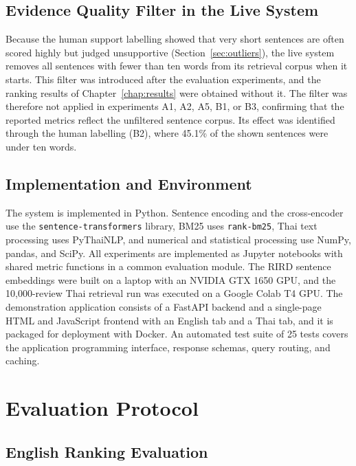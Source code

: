\subsection{Evidence Quality Filter in the Live System}
\label{sec:livefilter}

Because the human support labelling showed that very short sentences are often scored highly but judged unsupportive (Section~\ref{sec:outliers}), the live system removes all sentences with fewer than ten words from its retrieval corpus when it starts. This filter was introduced after the evaluation experiments, and the ranking results of Chapter~\ref{chap:results} were obtained without it. The filter was therefore not applied in experiments A1, A2, A5, B1, or B3, confirming that the reported metrics reflect the unfiltered sentence corpus. Its effect was identified through the human labelling (B2), where 45.1\% of the shown sentences were under ten words.

\subsection{Implementation and Environment}
\label{sec:implementation}

The system is implemented in Python. Sentence encoding and the cross-encoder use the \texttt{sentence-transformers} library, BM25 uses \texttt{rank-bm25}, Thai text processing uses PyThaiNLP, and numerical and statistical processing use NumPy, pandas, and SciPy. All experiments are implemented as Jupyter notebooks with shared metric functions in a common evaluation module. The RIRD sentence embeddings were built on a laptop with an NVIDIA GTX 1650 GPU, and the 10,000-review Thai retrieval run was executed on a Google Colab T4 GPU. The demonstration application consists of a FastAPI backend and a single-page HTML and JavaScript frontend with an English tab and a Thai tab, and it is packaged for deployment with Docker. An automated test suite of 25 tests covers the application programming interface, response schemas, query routing, and caching.

\section{Evaluation Protocol}
\label{sec:evalprotocol}

\subsection{English Ranking Evaluation}
\label{sec:englisheval}

